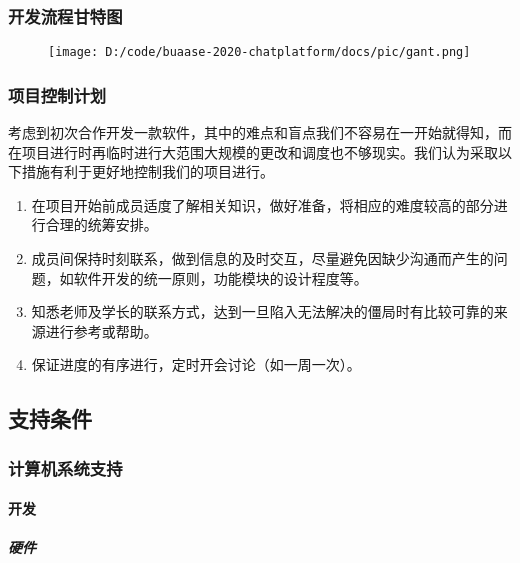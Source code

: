 \documentclass[
]{article}
\begin{document}
\hypertarget{header-n3671}{%
\subsubsection{开发流程甘特图}\label{header-n3671}}

\begin{figure}
\centering
\texttt{[image: D:/code/buaase-2020-chatplatform/docs/pic/gant.png]}
\caption{}
\end{figure}

\hypertarget{header-n3673}{%
\subsubsection{项目控制计划}\label{header-n3673}}

考虑到初次合作开发一款软件，其中的难点和盲点我们不容易在一开始就得知，而在项目进行时再临时进行大范围大规模的更改和调度也不够现实。我们认为采取以下措施有利于更好地控制我们的项目进行。

\begin{enumerate}
\def\labelenumi{\arabic{enumi}.}
\item
  在项目开始前成员适度了解相关知识，做好准备，将相应的难度较高的部分进行合理的统筹安排。
\item
  成员间保持时刻联系，做到信息的及时交互，尽量避免因缺少沟通而产生的问题，如软件开发的统一原则，功能模块的设计程度等。
\item
  知悉老师及学长的联系方式，达到一旦陷入无法解决的僵局时有比较可靠的来源进行参考或帮助。
\item
  保证进度的有序进行，定时开会讨论（如一周一次）。
\end{enumerate}

\hypertarget{header-n3684}{%
\subsection{支持条件}\label{header-n3684}}

\hypertarget{header-n3685}{%
\subsubsection{计算机系统支持}\label{header-n3685}}

\hypertarget{header-n3686}{%
\paragraph{开发}\label{header-n3686}}

\hypertarget{header-n3687}{%
\subparagraph{硬件}\label{header-n3687}}
\end{document}
